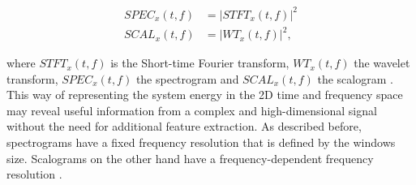 \begin{equation}
    \begin{aligned}
        SPEC_{x}(t,f) &= |STFT_{x}(t,f)|^{2} \\
        SCAL_{x}(t,f) &= |WT_{x}(t,f)|^{2}, 
    \end{aligned}
\end{equation}

where $STFT_{x}(t,f)$ is the Short-time Fourier transform, $WT_{x}(t,f)$ the wavelet transform, $SPEC_{x}(t,f)$ the spectrogram and $SCAL_{x}(t,f)$ the scalogram \cite{Hlawatsch1992}. This way of representing the system energy in the 2D time and frequency space may reveal useful information from a complex and high-dimensional signal without the need for additional feature extraction. As described before, spectrograms have a fixed frequency resolution that is defined by the windows size. Scalograms on the other hand have a frequency-dependent frequency resolution \cite{Verstraete2017}.

